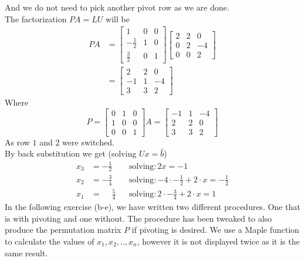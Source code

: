 \documentclass[12pt]{article}
\begin{document}
And we do not need to pick another pivot row as we are done.\\
The factorization $PA=LU$ will be
\begin{align*}
PA
&=
\begin{bmatrix}
1 & 0 & 0\\
-\frac{1}{2} & 1 & 0\\
\frac{3}{2} & 0 & 1
\end{bmatrix}
\begin{bmatrix}
2 & 2 & 0  \\
0 & 2 & -4\\
0 & 0 & 2
\end{bmatrix}\\
&=
\begin{bmatrix}
2 & 2 & 0  \\
-1 & 1 & -4\\
3 & 3 & 2
\end{bmatrix}
\end{align*}
Where
$$
P
=
\begin{bmatrix}
0 & 1 & 0  \\
1 & 0 & 0\\
0 & 0 & 1
\end{bmatrix}
A
=
\begin{bmatrix}
-1 & 1 & -4\\
2 & 2 & 0 \\
3 & 3 & 2 
\end{bmatrix}
$$
As row $1$ and $2$ were switched.\\
By back substitution we get (solving $Ux=\hat{b}$)
\begin{align*}
x_3&=-\frac{1}{2}&&\mbox{solving}:2x=-1\\
x_2&=-\frac{3}{4}&&\mbox{solving}:-4\cdot -\frac{1}{2}+2\cdot x=-\frac{1}{2}\\
x_1&=\phantom{-}\frac{5}{4}&&\mbox{solving}:2\cdot -\frac{3}{4}+2\cdot x=1
\end{align*}
In the following exercise (b-e), we have written two different procedures. One that is with pivoting and one without. The procedure has been tweaked to also produce the permutation matrix $P$ if pivoting is desired. We use a Maple function to calculate the values of $x_1,x_2,..,x_n$, however it is not displayed twice as it is the same result.\\
\end{document}
